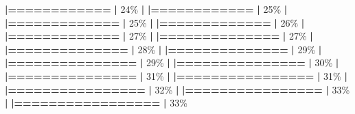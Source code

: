 \documentclass[
]{book}
\newenvironment{Shaded}{\begin{snugshade}}{\end{snugshade}}
\newcommand{\DecValTok}[1]{\textcolor[rgb]{0.00,0.00,0.81}{#1}}
\newcommand{\ErrorTok}[1]{\textcolor[rgb]{0.64,0.00,0.00}{\textbf{#1}}}
\newcommand{\NormalTok}[1]{#1}
\newcommand{\SpecialCharTok}[1]{\textcolor[rgb]{0.81,0.36,0.00}{\textbf{#1}}}
\begin{document}
\begin{Shaded}
\begin{Highlighting}[]
  \ErrorTok{|============}                                      \ErrorTok{|}  \DecValTok{24}\NormalTok{\%}
  \SpecialCharTok{|}                                                        
  \ErrorTok{|============}                                      \ErrorTok{|}  \DecValTok{25}\NormalTok{\%}
  \SpecialCharTok{|}                                                        
  \ErrorTok{|=============}                                     \ErrorTok{|}  \DecValTok{25}\NormalTok{\%}
  \SpecialCharTok{|}                                                        
  \ErrorTok{|=============}                                     \ErrorTok{|}  \DecValTok{26}\NormalTok{\%}
  \SpecialCharTok{|}                                                        
  \ErrorTok{|=============}                                     \ErrorTok{|}  \DecValTok{27}\NormalTok{\%}
  \SpecialCharTok{|}                                                        
  \ErrorTok{|==============}                                    \ErrorTok{|}  \DecValTok{27}\NormalTok{\%}
  \SpecialCharTok{|}                                                        
  \ErrorTok{|==============}                                    \ErrorTok{|}  \DecValTok{28}\NormalTok{\%}
  \SpecialCharTok{|}                                                        
  \ErrorTok{|==============}                                    \ErrorTok{|}  \DecValTok{29}\NormalTok{\%}
  \SpecialCharTok{|}                                                        
  \ErrorTok{|===============}                                   \ErrorTok{|}  \DecValTok{29}\NormalTok{\%}
  \SpecialCharTok{|}                                                        
  \ErrorTok{|===============}                                   \ErrorTok{|}  \DecValTok{30}\NormalTok{\%}
  \SpecialCharTok{|}                                                        
  \ErrorTok{|===============}                                   \ErrorTok{|}  \DecValTok{31}\NormalTok{\%}
  \SpecialCharTok{|}                                                        
  \ErrorTok{|================}                                  \ErrorTok{|}  \DecValTok{31}\NormalTok{\%}
  \SpecialCharTok{|}                                                        
  \ErrorTok{|================}                                  \ErrorTok{|}  \DecValTok{32}\NormalTok{\%}
  \SpecialCharTok{|}                                                        
  \ErrorTok{|================}                                  \ErrorTok{|}  \DecValTok{33}\NormalTok{\%}
  \SpecialCharTok{|}                                                        
  \ErrorTok{|=================}                                 \ErrorTok{|}  \DecValTok{33}\NormalTok{\%}

\end{Highlighting}
\end{Shaded}
\end{document}
